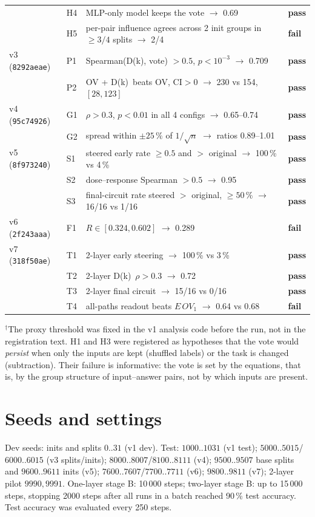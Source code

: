 \documentclass[10pt]{article}
\newcommand{\pass}{\textcolor{green!45!black}{\textbf{pass}}}
\newcommand{\fail}{\textcolor{red!70!black}{\textbf{fail}}}
\newcommand{\Dk}{D(k)}
\begin{document}
\begin{table}[!htbp]
\begin{tabularx}{\linewidth}{@{}l l X l@{}}
 & H4 & MLP-only model keeps the vote $\to$ 0.69 & \pass \\
 & H5 & per-pair influence agrees across 2 init groups in $\ge3/4$ splits $\to$ 2/4 & \fail \\
v3 (\texttt{8292aeae}) & P1 & Spearman(\Dk, vote) $>0.5$, $p<10^{-3}$ $\to$ 0.709 & \pass \\
 & P2 & OV + \Dk\ beats OV, CI$>0$ $\to$ 230 vs 154, $[28,123]$ & \pass \\
v4 (\texttt{95c74926}) & G1 & $\rho>0.3$, $p<0.01$ in all 4 configs $\to$ 0.65--0.74 & \pass \\
 & G2 & spread within $\pm25\,\%$ of $1/\sqrt n$ $\to$ ratios 0.89--1.01 & \pass \\
v5 (\texttt{8f973240}) & S1 & steered early rate $\ge0.5$ and $>$ original $\to$ 100\,\% vs 4\,\% & \pass \\
 & S2 & dose--response Spearman $>0.5$ $\to$ 0.95 & \pass \\
 & S3 & final-circuit rate steered $>$ original, $\ge50\,\%$ $\to$ 16/16 vs 1/16 & \pass \\
v6 (\texttt{2f243aaa}) & F1 & $R\in[0.324,0.602]$ $\to$ 0.289 & \fail \\
v7 (\texttt{318f50ae}) & T1 & 2-layer early steering $\to$ 100\,\% vs 3\,\% & \pass \\
 & T2 & 2-layer \Dk\ $\rho>0.3$ $\to$ 0.72 & \pass \\
 & T3 & 2-layer final circuit $\to$ 15/16 vs 0/16 & \pass \\
 & T4 & all-paths readout beats $E\,OV_1$ $\to$ 0.64 vs 0.68 & \fail \\\bottomrule
\end{tabularx}
\end{table}
$^\dagger$The proxy threshold was fixed in the v1 analysis code before the run, not in the registration text.
H1 and H3 were registered as hypotheses that the vote would \emph{persist} when only the inputs are kept (shuffled
labels) or the task is changed (subtraction). Their failure is informative: the vote is set by the equations, that is, by
the group structure of input--answer pairs, not by which inputs are present.

\section{Seeds and settings}
Dev seeds: inits and splits $0..31$ (v1 dev). Test: $1000..1031$ (v1 test); $5000..5015$/$6000..6015$ (v3 splits/inits);
$8000..8007$/$8100..8111$ (v4); $9500..9507$ base splits and $9600..9611$ inits (v5); $7600..7607$/$7700..7711$ (v6);
$9800..9811$ (v7); 2-layer pilot $9990,9991$. One-layer stage B: 10\,000 steps; two-layer stage B: up to 15\,000 steps,
stopping 2000 steps after all runs in a batch reached 90\,\% test accuracy. Test accuracy was evaluated every 250 steps.
\end{document}
